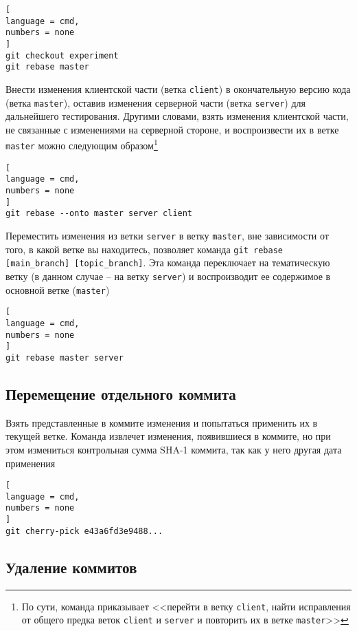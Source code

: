 \documentclass[%
	11pt,
	a4paper,
	utf8,
		]{article}
\begin{document}
\begin{lstlisting}[
language = cmd,
numbers = none
]
git checkout experiment
git rebase master
\end{lstlisting}


Внести изменения клиентской части (ветка \texttt{client}) в окончательную версию кода (ветка \texttt{master}), оставив изменения серверной части (ветка \texttt{server}) для дальнейшего тестирования. Другими словами, взять изменения клиентской части, не связанные с изменениями на серверной стороне, и воспроизвести их в ветке \texttt{master} можно следующим образом\footnote{По сути, команда приказывает <<перейти в ветку \texttt{client}, найти исправления от общего предка веток \texttt{client} и \texttt{server} и повторить их в ветке \texttt{master}>>}

\begin{lstlisting}[
language = cmd,
numbers = none
]
git rebase --onto master server client
\end{lstlisting}

Переместить изменения из ветки \texttt{server} в ветку \texttt{master}, вне зависимости от того, в какой ветке вы находитесь, позволяет команда \texttt{git rebase [main\_branch] [topic\_branch]}. Эта команда переключает на тематическую ветку (в данном случае -- на ветку \texttt{server}) и воспроизводит ее содержимое в основной ветке (\texttt{master})

\begin{lstlisting}[
language = cmd,
numbers = none
]
git rebase master server
\end{lstlisting}


\subsection{Перемещение отдельного коммита}

Взять представленные в коммите изменения и попытаться применить их в текущей ветке. Команда извлечет изменения, появившиеся в коммите, но при этом измениться контрольная сумма SHA-1 коммита, так как у него другая дата применения

\begin{lstlisting}[
language = cmd,
numbers = none
]
git cherry-pick e43a6fd3e9488...
\end{lstlisting}


\subsection{Удаление коммитов}
\end{document}

